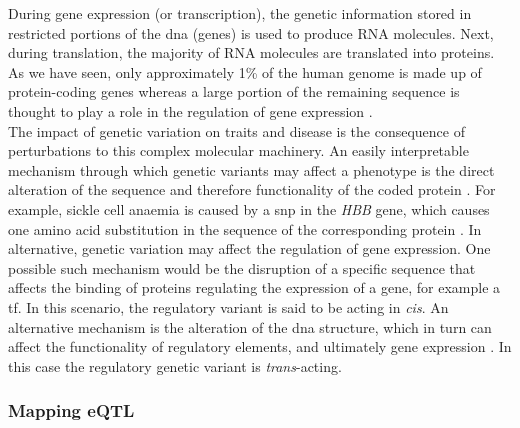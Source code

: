 During gene expression (or transcription), the genetic information stored in restricted portions of the \gls{dna} (genes) is used to produce 
RNA molecules. 
Next, during translation, the majority of RNA molecules are translated into  proteins. 
As we have seen, only approximately 1\% of the human genome is made up of protein-coding genes \cite{lander2001initial} whereas a large portion of the remaining sequence is thought to play a role in the regulation of gene expression \cite{encode2004encode}. \\

The impact of genetic variation on traits and disease is the consequence of perturbations to this complex molecular machinery.
An easily interpretable mechanism through which genetic variants may affect a phenotype is the direct alteration of the sequence 
and therefore functionality of the coded protein \cite{westra2014genome}. 
For example, sickle cell anaemia is caused by a \gls{snp} in the \textit{HBB} gene, which causes one amino acid substitution in the sequence of the corresponding protein \cite{laird2010fundamentals}. 
In alternative, genetic variation may affect the regulation of gene expression. 
One possible such mechanism would be the disruption of a specific sequence that affects the binding of
proteins regulating the expression of a gene, 
for example 
a \gls{tf}. 
In this scenario, the regulatory variant is said to be acting in \textit{cis}.
An alternative mechanism is the alteration of the \gls{dna} structure, which in turn can affect the functionality of regulatory elements, and ultimately gene expression \cite{encode2004encode, kundaje2015integrative}. 
In this case the regulatory genetic variant is \textit{trans}-acting. 

\subsubsection{Mapping eQTL}
\label{sec:eqtl_map}

